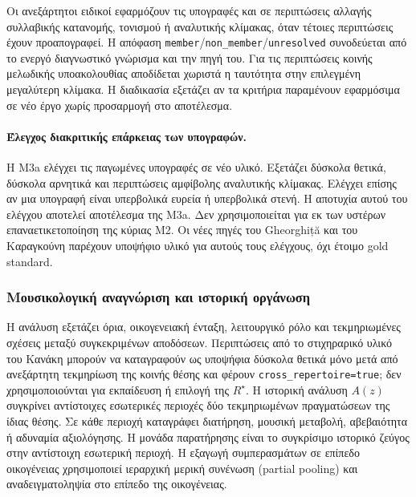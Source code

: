\documentclass[11pt,a4paper]{article}
\begin{document}
Οι ανεξάρτητοι ειδικοί εφαρμόζουν τις υπογραφές και σε περιπτώσεις αλλαγής συλλαβικής κατανομής, τονισμού ή αναλυτικής κλίμακας, όταν τέτοιες περιπτώσεις έχουν προαπογραφεί. Η απόφαση \texttt{member}/\texttt{non\_member}/\texttt{unresolved} συνοδεύεται από το ενεργό διαγνωστικό γνώρισμα και την πηγή του. Για τις περιπτώσεις κοινής μελωδικής υποακολουθίας αποδίδεται χωριστά η ταυτότητα στην επιλεγμένη μεγαλύτερη κλίμακα. Η διαδικασία εξετάζει αν τα κριτήρια παραμένουν εφαρμόσιμα σε νέο έργο χωρίς προσαρμογή στο αποτέλεσμα.

\paragraph{Έλεγχος διακριτικής επάρκειας των υπογραφών.}
Η M3a ελέγχει τις παγωμένες υπογραφές σε νέο υλικό. Εξετάζει δύσκολα θετικά, δύσκολα αρνητικά και περιπτώσεις αμφίβολης αναλυτικής κλίμακας. Ελέγχει επίσης αν μια υπογραφή είναι υπερβολικά ευρεία ή υπερβολικά στενή. Η αποτυχία αυτού του ελέγχου αποτελεί αποτέλεσμα της M3a. Δεν χρησιμοποιείται για εκ των υστέρων επαναετικετοποίηση της κύριας M2. Οι νέες πηγές του Gheorghiță και του Καραγκούνη παρέχουν υποψήφιο υλικό για αυτούς τους ελέγχους, όχι έτοιμο gold standard.

\subsubsection{Μουσικολογική αναγνώριση και ιστορική οργάνωση}
Η ανάλυση εξετάζει όρια, οικογενειακή ένταξη, λειτουργικό ρόλο και τεκμηριωμένες σχέσεις μεταξύ συγκεκριμένων αποδόσεων. Περιπτώσεις από το στιχηραρικό υλικό του Κανάκη μπορούν να καταγραφούν ως υποψήφια δύσκολα θετικά μόνο μετά από ανεξάρτητη τεκμηρίωση της κοινής θέσης και φέρουν \texttt{cross\_repertoire=true}; δεν χρησιμοποιούνται για εκπαίδευση ή επιλογή της $R^\star$. Η ιστορική ανάλυση $A(z)$ συγκρίνει αντίστοιχες εσωτερικές περιοχές δύο τεκμηριωμένων πραγματώσεων της ίδιας θέσης. Σε κάθε περιοχή καταγράφει διατήρηση, μουσική μεταβολή, αβεβαιότητα ή αδυναμία αξιολόγησης. Η μονάδα παρατήρησης είναι το συγκρίσιμο ιστορικό ζεύγος στην αντίστοιχη εσωτερική περιοχή. Η εξαγωγή συμπερασμάτων σε επίπεδο οικογένειας χρησιμοποιεί ιεραρχική μερική συνένωση (partial pooling) και αναδειγματοληψία στο επίπεδο της οικογένειας.
\end{document}
